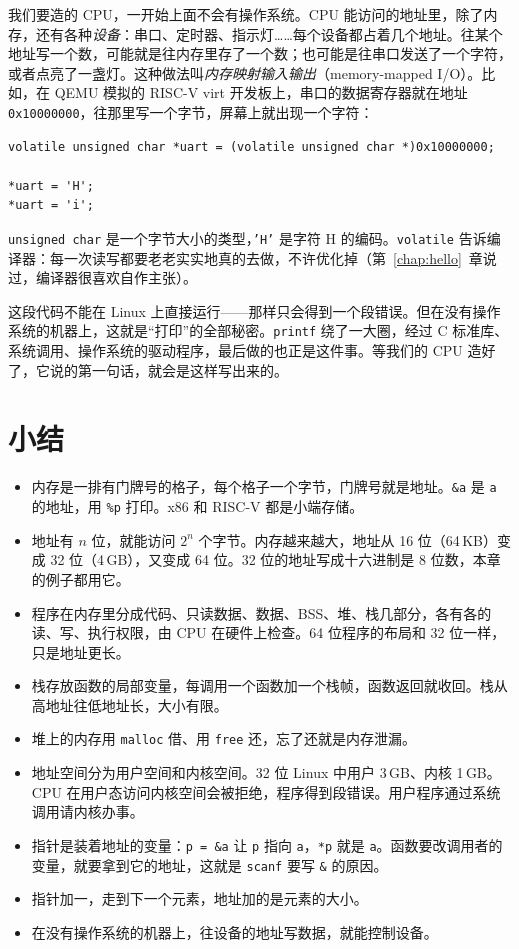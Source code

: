 我们要造的 CPU，一开始上面不会有操作系统。CPU 能访问的地址里，除了内存，还有各种\emph{设备}：串口、定时器、指示灯……每个设备都占着几个地址。往某个地址写一个数，可能就是往内存里存了一个数；也可能是往串口发送了一个字符，或者点亮了一盏灯。这种做法叫\emph{内存映射输入输出}（memory-mapped I/O）。比如，在 QEMU 模拟的 RISC-V virt 开发板上，串口的数据寄存器就在地址 \texttt{0x10000000}，往那里写一个字节，屏幕上就出现一个字符：
\begin{verbatim}
volatile unsigned char *uart = (volatile unsigned char *)0x10000000;

*uart = 'H';
*uart = 'i';
\end{verbatim}

\texttt{unsigned char} 是一个字节大小的类型，\texttt{'H'} 是字符 H 的编码。\texttt{volatile} 告诉编译器：每一次读写都要老老实实地真的去做，不许优化掉（第~\ref{chap:hello}~章说过，编译器很喜欢自作主张）。

这段代码不能在 Linux 上直接运行——那样只会得到一个段错误。但在没有操作系统的机器上，这就是“打印”的全部秘密。\texttt{printf} 绕了一大圈，经过 C 标准库、系统调用、操作系统的驱动程序，最后做的也正是这件事。等我们的 CPU 造好了，它说的第一句话，就会是这样写出来的。

\section{小结}

\begin{itemize}
  \item 内存是一排有门牌号的格子，每个格子一个字节，门牌号就是地址。\texttt{\&a} 是 \texttt{a} 的地址，用 \texttt{\%p} 打印。x86 和 RISC-V 都是小端存储。
  \item 地址有 $n$ 位，就能访问 $2^n$ 个字节。内存越来越大，地址从 16 位（64\,KB）变成 32 位（4\,GB），又变成 64 位。32 位的地址写成十六进制是 8 位数，本章的例子都用它。
  \item 程序在内存里分成代码、只读数据、数据、BSS、堆、栈几部分，各有各的读、写、执行权限，由 CPU 在硬件上检查。64 位程序的布局和 32 位一样，只是地址更长。
  \item 栈存放函数的局部变量，每调用一个函数加一个栈帧，函数返回就收回。栈从高地址往低地址长，大小有限。
  \item 堆上的内存用 \texttt{malloc} 借、用 \texttt{free} 还，忘了还就是内存泄漏。
  \item 地址空间分为用户空间和内核空间。32 位 Linux 中用户 3\,GB、内核 1\,GB。CPU 在用户态访问内核空间会被拒绝，程序得到段错误。用户程序通过系统调用请内核办事。
  \item 指针是装着地址的变量：\texttt{p = \&a} 让 \texttt{p} 指向 \texttt{a}，\texttt{*p} 就是 \texttt{a}。函数要改调用者的变量，就要拿到它的地址，这就是 \texttt{scanf} 要写 \texttt{\&} 的原因。
  \item 指针加一，走到下一个元素，地址加的是元素的大小。
  \item 在没有操作系统的机器上，往设备的地址写数据，就能控制设备。
\end{itemize}


